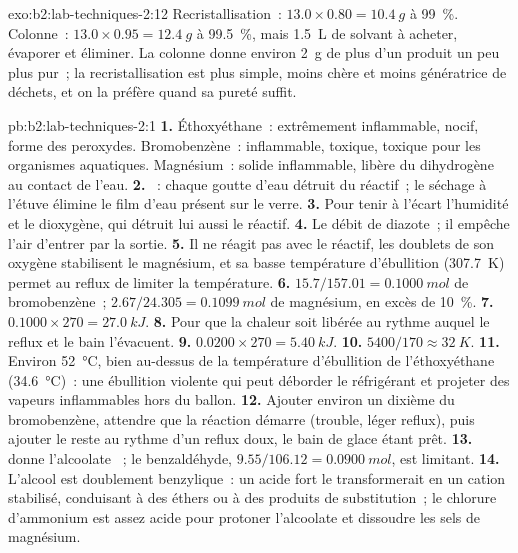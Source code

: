 \begin{solution}{exo:b2:lab-techniques-2:12}
Recristallisation~: $13.0 \times 0.80 = \qty{10.4}{g}$ à 99~\%. Colonne~: $13.0 \times 0.95 =
\qty{12.4}{g}$ à 99.5~\%, mais \qty{1.5}{L} de solvant à acheter, évaporer et éliminer. La colonne donne
environ \qty{2}{g} de plus d'un produit un peu plus pur~; la recristallisation est plus simple, moins chère
et moins génératrice de déchets, et on la préfère quand sa pureté suffit.
\end{solution}

\begin{solution}{pb:b2:lab-techniques-2:1}
\textbf{1.} Éthoxyéthane~: extrêmement inflammable, nocif, forme des peroxydes. Bromobenzène~: inflammable,
toxique, toxique pour les organismes aquatiques. Magnésium~: solide inflammable, libère du dihydrogène au
contact de l'eau.
\textbf{2.} ~: chaque goutte d'eau détruit du réactif~; le séchage à
l'étuve élimine le film d'eau présent sur le verre.
\textbf{3.} Pour tenir à l'écart l'humidité et le dioxygène, qui détruit lui aussi le réactif.
\textbf{4.} Le débit de diazote~; il empêche l'air d'entrer par la sortie.
\textbf{5.} Il ne réagit pas avec le réactif, les doublets de son oxygène stabilisent le magnésium, et sa
basse température d'ébullition (\qty{307.7}{K}) permet au reflux de limiter la température.
\textbf{6.} $15.7/157.01 = \qty{0.1000}{mol}$ de bromobenzène~; $2.67/24.305 = \qty{0.1099}{mol}$ de magnésium,
en excès de 10~\%.
\textbf{7.} $0.1000 \times 270 = \qty{27.0}{kJ}$.
\textbf{8.} Pour que la chaleur soit libérée au rythme auquel le reflux et le bain l'évacuent.
\textbf{9.} $0.0200 \times 270 = \qty{5.40}{kJ}$.
\textbf{10.} $5400/170 \approx \qty{32}{K}$.
\textbf{11.} Environ \qty{52}{\degreeCelsius}, bien au-dessus de la température d'ébullition de l'éthoxyéthane
(\qty{34.6}{\degreeCelsius})~: une ébullition violente qui peut déborder le réfrigérant et projeter des vapeurs
inflammables hors du ballon.
\textbf{12.} Ajouter environ un dixième du bromobenzène, attendre que la réaction démarre (trouble, léger
reflux), puis ajouter le reste au rythme d'un reflux doux, le bain de glace étant prêt.
\textbf{13.}  donne l'alcoolate ~; le benzaldéhyde,
$9.55/106.12 = \qty{0.0900}{mol}$, est limitant.
\textbf{14.} L'alcool est doublement benzylique~: un acide fort le transformerait en un cation stabilisé,
conduisant à des éthers ou à des produits de substitution~; le chlorure d'ammonium est assez acide pour
protoner l'alcoolate et dissoudre les sels de magnésium.

\end{solution}
